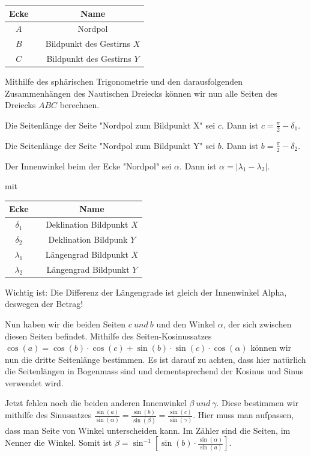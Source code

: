\begin{center}
	\begin{tabular}{ c c c }
		Ecke && Name  \\ 
		\hline
		$A$ && Nordpol \\  
		$B$ && Bildpunkt des Gestirns $X$ \\
		$C$&& Bildpunkt des Gestirns $Y$
	\end{tabular}
\end{center}

Mithilfe des sphärischen Trigonometrie und den darausfolgenden Zusammenhängen des Nautischen Dreiecks können wir nun alle Seiten des Dreiecks $ABC$ berechnen.

Die Seitenlänge der Seite "Nordpol zum Bildpunkt X" sei $c$. 
Dann ist $c = \frac{\pi}{2} - \delta_1$. 

Die Seitenlänge der Seite "Nordpol zum Bildpunkt Y" sei $b$.
Dann ist $b = \frac{\pi}{2} - \delta_2$. 

Der Innenwinkel beim der Ecke "Nordpol" sei $\alpha$.
Dann ist $ \alpha = |\lambda_1 - \lambda_2|$. 

mit 
\begin{center}
	\begin{tabular}{ c c c }
		Ecke && Name  \\ 
		\hline
		$\delta_1$ && Deklination Bildpunkt $X$ \\  
		$\delta_2$ && Deklination Bildpunk $Y$ \\
		$\lambda_1 $&& Längengrad Bildpunkt $X$\\
		$\lambda_2$ && Längengrad Bildpunkt $Y$
	\end{tabular}
\end{center}

Wichtig ist: Die Differenz der Längengrade ist gleich der Innenwinkel Alpha, deswegen der Betrag!

Nun haben wir die beiden Seiten $c\ und\ b$ und den Winkel $\alpha$, der sich zwischen diesen Seiten befindet. 
Mithilfe des Seiten-Kosinussatzes 
$\cos(a) = \cos(b)\cdot \cos(c) + \sin(b) \cdot \sin(c)\cdot \cos(\alpha)$ 
können wir nun die dritte Seitenlänge bestimmen. 
Es ist darauf zu achten, dass hier natürlich die Seitenlängen in Bogenmass sind und dementsprechend der Kosinus und Sinus verwendet wird. 

Jetzt fehlen noch die beiden anderen Innenwinkel $\beta \ und\ \gamma$.
Diese bestimmen wir mithilfe des Sinussatzes $\frac{\sin (a)}{\sin (\alpha)} =\frac{\sin (b)}{\sin (\beta)} = \frac{\sin (c)}{\sin (\gamma)}$.
Hier muss man aufpassen, dass man Seite von Winkel unterscheiden kann. 
Im Zähler sind die Seiten, im Nenner die Winkel. 
Somit ist $\beta =\sin^{-1} [\sin(b) \cdot \frac{\sin(\alpha)}{\sin(a)}] $.

